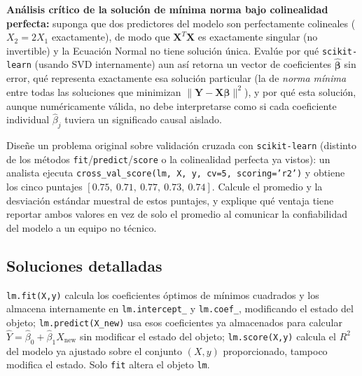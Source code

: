 \begin{problema}
	\label{prob:5ad88f8}
	\textbf{Análisis crítico de la solución de mínima norma bajo colinealidad perfecta:} suponga que dos predictores del modelo son perfectamente colineales ($X_2=2X_1$ exactamente), de modo que $\mathbf{X}^T\mathbf{X}$ es exactamente singular (no invertible) y la Ecuación Normal no tiene solución única. Evalúe por qué \texttt{scikit-learn} (usando SVD internamente) aun así retorna un vector de coeficientes $\hat{\boldsymbol\beta}$ sin error, qué representa exactamente esa solución particular (la de \emph{norma mínima} entre todas las soluciones que minimizan $\|\mathbf{Y}-\mathbf{X}\boldsymbol\beta\|^2$), y por qué esta solución, aunque numéricamente válida, no debe interpretarse como si cada coeficiente individual $\hat\beta_j$ tuviera un significado causal aislado.
\end{problema}

\begin{problema}
	\label{prob:0abfd8d}
	Diseñe un problema original sobre validación cruzada con \texttt{scikit-learn} (distinto de los métodos \texttt{fit}/\texttt{predict}/\texttt{score} o la colinealidad perfecta ya vistos): un analista ejecuta \texttt{cross\_val\_score(lm, X, y, cv=5, scoring='r2')} y obtiene los cinco puntajes $[0.75,\ 0.71,\ 0.77,\ 0.73,\ 0.74]$. Calcule el promedio y la desviación estándar muestral de estos puntajes, y explique qué ventaja tiene reportar ambos valores en vez de solo el promedio al comunicar la confiabilidad del modelo a un equipo no técnico.
\end{problema}

\subsection*{Soluciones detalladas}

\begin{solproblema}
	\texttt{lm.fit(X,y)} calcula los coeficientes óptimos de mínimos cuadrados y los almacena internamente en \texttt{lm.intercept\_} y \texttt{lm.coef\_}, modificando el estado del objeto; \texttt{lm.predict(X\_new)} usa esos coeficientes ya almacenados para calcular $\hat Y=\hat\beta_0+\hat\beta_1X_{\text{new}}$ sin modificar el estado del objeto; \texttt{lm.score(X,y)} calcula el $R^2$ del modelo ya ajustado sobre el conjunto $(X,y)$ proporcionado, tampoco modifica el estado. Solo \texttt{fit} altera el objeto \texttt{lm}.
\end{solproblema}

